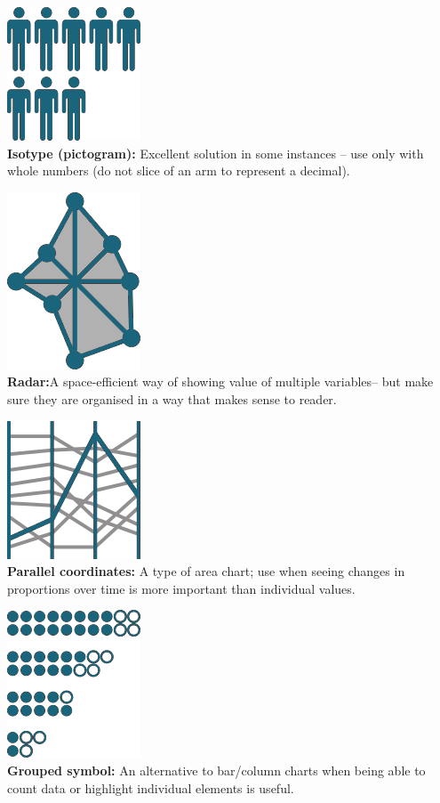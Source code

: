 \documentclass[
  a4paper,
  onecolumn,
  oneside]{book}
\begin{document}
\includegraphics{part1/images/magnitude4.png}\\
\textbf{Isotype (pictogram):} Excellent solution in some instances --
use only with whole numbers (do not slice of an arm to represent a
decimal).

\includegraphics{part1/images/magnitude5.png}\\
\textbf{Radar:}A space-efficient way of showing value of multiple
variables-- but make sure they are organised in a way that makes sense
to reader.

\includegraphics{part1/images/magnitude6.png}\\
\textbf{Parallel coordinates:} A type of area chart; use when seeing
changes in proportions over time is more important than individual
values.

\includegraphics{part1/images/magnitude7.png}\\
\textbf{Grouped symbol:} An alternative to bar/column charts when being
able to count data or highlight individual elements is useful.
\end{document}
